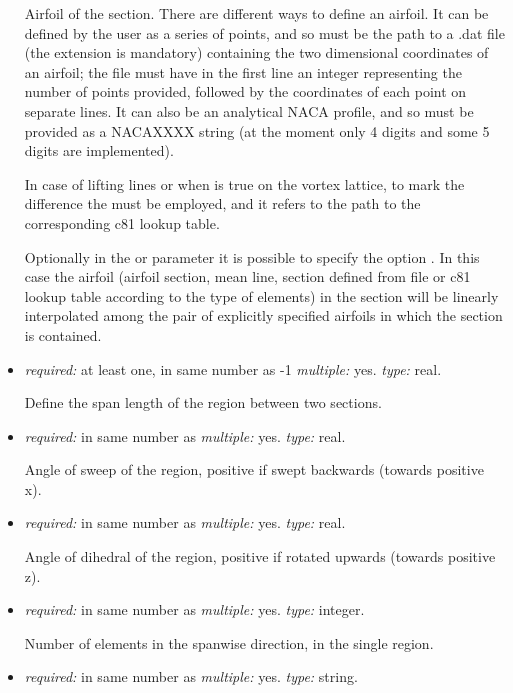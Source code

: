 \begin{itemize}
Airfoil of the section. There are different ways to define an airfoil. It can be defined by the user as a 
series of points, and so  must be the path to a .dat file (the extension is mandatory) 
containing the two dimensional coordinates of an airfoil; the file must have in the first line an integer 
representing the number of points provided, followed by the coordinates of each point on separate lines. 
It can also be an analytical NACA profile, and so must be provided as a 
NACAXXXX string (at the moment only 4 digits and some 5 digits are implemented). 

In case of lifting lines or when  is true on the vortex lattice, to mark 
the difference the  must be employed, and it refers to the path to the corresponding c81 lookup table. 

Optionally in the  or  parameter it is possible to specify the option 
. In this case the airfoil (airfoil section, mean line, section defined from file or c81 lookup 
table according to the type of elements) in the section will be linearly interpolated among the pair of 
explicitly specified airfoils in which the section is contained. 

\item {} \textit{required:} at least one, in same number as -1 \textit{multiple:} yes. \textit{type:} real.

Define the span length of the region between two sections.  

\item {} \textit{required:} in same number as  \textit{multiple:} yes. \textit{type:} real.

Angle of sweep of the region, positive if swept backwards (towards positive x).

\item {} \textit{required:} in same number as  \textit{multiple:} yes. \textit{type:} real.

Angle of dihedral of the region, positive if rotated upwards (towards positive z).

\item {} \textit{required:} in same number as  \textit{multiple:} yes. \textit{type:} integer.

Number of elements in the spanwise direction, in the single region.

\item {} \textit{required:} in same number as  \textit{multiple:} yes. \textit{type:} string.


\end{itemize}
